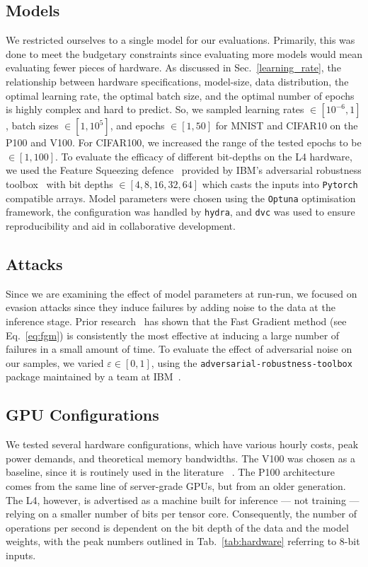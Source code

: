 \documentclass[conference]{IEEEtran}
\begin{document}
\subsection{Models}
We restricted ourselves to a single model for our evaluations. Primarily, this was done to meet the budgetary constraints since evaluating more models would mean evaluating fewer pieces of hardware. As discussed in Sec.~\ref{learning_rate}, the relationship between hardware specifications, model-size, data distribution, the optimal learning rate, the optimal batch size, and the optimal number of epochs is highly complex and hard to predict. So, we sampled learning rates $\in [10^{-6}, 1]$, batch sizes $\in [1, 10^5]$, and epochs $\in [1, 50]$ for MNIST and CIFAR10 on the P100 and V100. For CIFAR100, we increased the range of the tested epochs to be $\in [1, 100]$. To evaluate the efficacy of different bit-depths on the L4 hardware, we used the Feature Squeezing defence~\cite{feature_squeezing} provided by IBM's adversarial robustness toolbox~\cite{art2018} with bit depths $\in [4,8,16,32,64]$ which casts the inputs into \texttt{Pytorch} compatible arrays. Model parameters were chosen using the \texttt{Optuna} optimisation framework, the configuration was handled by \texttt{hydra}, and \texttt{dvc} was used to ensure reproducibility and aid in collaborative development.


\subsection{Attacks}
Since we are examining the effect of model parameters at run-run, we focused on evasion attacks since they induce failures by adding noise to the data at the inference stage. Prior research~\cite{meyers} has shown that the Fast Gradient method (see Eq.~\ref{eq:fgm}) is consistently the most effective at inducing a large number of failures in a small amount of time. To evaluate the effect of adversarial noise on our samples, we varied $\varepsilon \in [0, 1]$, using the \texttt{adversarial-robustness-toolbox} package maintained by a team at IBM~\cite{art2018}.


\subsection{GPU Configurations}
We tested several hardware configurations, which have various hourly costs, peak power demands, and theoretical memory bandwidths. The V100 was chosen as a baseline, since it is  routinely used in the literature ~\cite{svedin2021benchmarking,xu2018deep}. The P100 architecture comes from the same line of server-grade GPUs, but from an older generation. The L4, however, is advertised as a machine built for inference --- not training --- relying on a smaller number of bits per tensor core. Consequently, the number of operations per second is dependent on the bit depth of the data and the model weights, with the peak numbers outlined in Tab.~\ref{tab:hardware} referring to 8-bit inputs.
\end{document}

